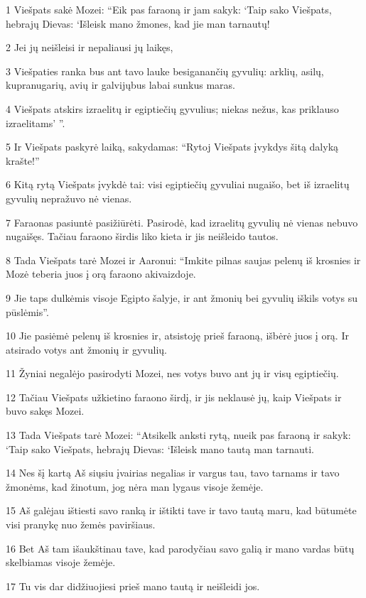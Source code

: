 \par 1 Viešpats sakė Mozei: “Eik pas faraoną ir jam sakyk: ‘Taip sako Viešpats, hebrajų Dievas: ‘Išleisk mano žmones, kad jie man tarnautų! 
\par 2 Jei jų neišleisi ir nepaliausi jų laikęs, 
\par 3 Viešpaties ranka bus ant tavo lauke besiganančių gyvulių: arklių, asilų, kupranugarių, avių ir galvijų­bus labai sunkus maras. 
\par 4 Viešpats atskirs izraelitų ir egiptiečių gyvulius; niekas nežus, kas priklauso izraelitams’ ”. 
\par 5 Ir Viešpats paskyrė laiką, sakydamas: “Rytoj Viešpats įvykdys šitą dalyką krašte!” 
\par 6 Kitą rytą Viešpats įvykdė tai: visi egiptiečių gyvuliai nugaišo, bet iš izraelitų gyvulių nepražuvo nė vienas. 
\par 7 Faraonas pasiuntė pasižiūrėti. Pasirodė, kad izraelitų gyvulių nė vienas nebuvo nugaišęs. Tačiau faraono širdis liko kieta ir jis neišleido tautos. 
\par 8 Tada Viešpats tarė Mozei ir Aaronui: “Imkite pilnas saujas pelenų iš krosnies ir Mozė teberia juos į orą faraono akivaizdoje. 
\par 9 Jie taps dulkėmis visoje Egipto šalyje, ir ant žmonių bei gyvulių iškils votys su pūslėmis”. 
\par 10 Jie pasiėmė pelenų iš krosnies ir, atsistoję prieš faraoną, išbėrė juos į orą. Ir atsirado votys ant žmonių ir gyvulių. 
\par 11 Žyniai negalėjo pasirodyti Mozei, nes votys buvo ant jų ir visų egiptiečių. 
\par 12 Tačiau Viešpats užkietino faraono širdį, ir jis neklausė jų, kaip Viešpats ir buvo sakęs Mozei. 
\par 13 Tada Viešpats tarė Mozei: “Atsikelk anksti rytą, nueik pas faraoną ir sakyk: ‘Taip sako Viešpats, hebrajų Dievas: ‘Išleisk mano tautą man tarnauti. 
\par 14 Nes šį kartą Aš siųsiu įvairias negalias ir vargus tau, tavo tarnams ir tavo žmonėms, kad žinotum, jog nėra man lygaus visoje žemėje. 
\par 15 Aš galėjau ištiesti savo ranką ir ištikti tave ir tavo tautą maru, kad būtumėte visi pranykę nuo žemės paviršiaus. 
\par 16 Bet Aš tam išaukštinau tave, kad parodyčiau savo galią ir mano vardas būtų skelbiamas visoje žemėje. 
\par 17 Tu vis dar didžiuojiesi prieš mano tautą ir neišleidi jos. 
